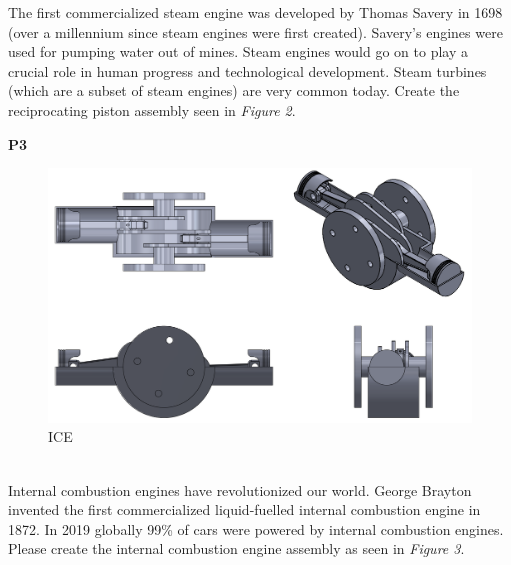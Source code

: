 \documentclass{article}
\begin{document}
{\begin{minipage}[c]{.25\linewidth}
\end{minipage}
\noindent The first commercialized steam engine was developed by Thomas Savery in 1698 (over a millennium since steam engines were first created). Savery’s engines were used for pumping water out of mines. Steam engines would go on to play a crucial role in human progress and technological development. Steam turbines (which are a subset of steam engines) are very common today. Create the reciprocating piston assembly seen in \textit{Figure 2}. 

\textbf{P3}\\[0mm]
\begin{figure}[H]
  \centering
  \includegraphics[width=.6\linewidth]{images/3.png}  %
  \caption{ICE}
  \label{fig:4}
\end{figure}
  \\ %
\noindent\justify Internal combustion engines have revolutionized our world. George Brayton invented the first commercialized liquid-fuelled internal combustion engine in 1872. In 2019 globally 99\% of cars were powered by internal combustion engines. Please create the internal combustion engine assembly as seen in \textit{Figure 3}. 


}
\end{document}
